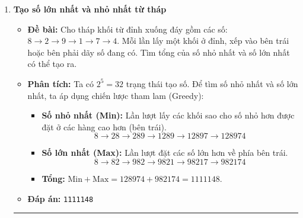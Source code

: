 \documentclass[11pt,a4paper]{article}
\begin{document}
\begin{enumerate}[label=\textbf{Câu \arabic*:}, leftmargin=*]
\hrule
\vspace{0.5cm}

\item \textbf{Tạo số lớn nhất và nhỏ nhất từ tháp}
    \begin{itemize}
        \item \textbf{Đề bài:} Cho tháp khối từ đỉnh xuống đáy gồm các số: $8 \to 2 \to 9 \to 1 \to 7 \to 4$. Mỗi lần lấy một khối ở đỉnh, xếp vào bên trái hoặc bên phải dãy số đang có. Tìm tổng của số nhỏ nhất và số lớn nhất có thể tạo ra.
        \item \textbf{Phân tích:}
            Ta có $2^5 = 32$ trạng thái tạo số. Để tìm số nhỏ nhất và số lớn nhất, ta áp dụng chiến lược tham lam (Greedy):
            \begin{itemize}
                \item \textbf{Số nhỏ nhất (Min):} Lần lượt lấy các khối sao cho số nhỏ hơn được đặt ở các hàng cao hơn (bên trái).
                    $$8 \to 28 \to 289 \to 1289 \to 12897 \to 128974$$
                \item \textbf{Số lớn nhất (Max):} Lần lượt đặt các số lớn hơn về phía bên trái.
                    $$8 \to 82 \to 982 \to 9821 \to 98217 \to 982174$$
                \item \textbf{Tổng:} $\text{Min} + \text{Max} = 128974 + 982174 = 1111148$.
            \end{itemize}
        \item \textbf{Đáp án:} \texttt{1111148}
    \end{itemize}

\hrule
\vspace{0.5cm}


\end{enumerate}
\end{document}
